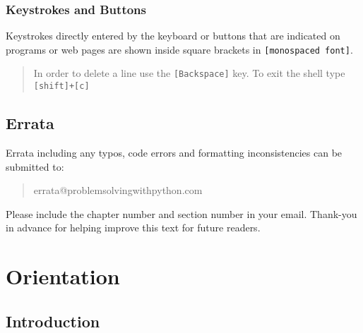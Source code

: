\documentclass{book}
\newcommand{\passthrough}[1]{#1}
\begin{document}
    
        \hypertarget{keystrokes-and-buttons}{%
\subsection{Keystrokes and Buttons}\label{keystrokes-and-buttons}}

Keystrokes directly entered by the keyboard or buttons that are
indicated on programs or web pages are shown inside square brackets in
\passthrough{\lstinline![monospaced font]!}.

\begin{quote}
In order to delete a line use the \passthrough{\lstinline![Backspace]!}
key. To exit the shell type \passthrough{\lstinline![shift]+[c]!}
\end{quote}
    




    
        \hypertarget{errata}{%
\section*{Errata}\label{errata} 
 }    




    
        Errata including any typos, code errors and formatting inconsistencies
can be submitted to:

\begin{quote}
errata@problemsolvingwithpython.com
\end{quote}

Please include the chapter number and section number in your email.
Thank-you in advance for helping improve this text for future readers.
    




    
        \hypertarget{orientation}{%
\chapter{Orientation}\label{orientation}}
    




    
        \hypertarget{introduction}{%
\section{Introduction}\label{introduction}}
    
\end{document}
